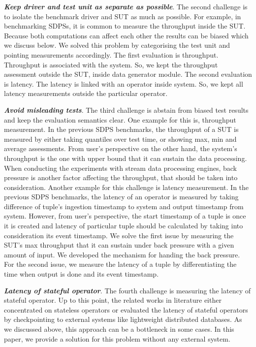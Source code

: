 \documentclass{vldb}
\begin{document}
\textbf{ \textit{Keep driver and test unit as separate as possible}}. The second challenge is to isolate the benchmark driver and SUT as much as possible. For example, in benchmarking SDPSs, it is common to measure the throughput inside the SUT. Because both computations can affect each other the results can be  biased  which we discuss below. We solved this problem by categorising the test unit and pointing measurements accordingly. The first evaluation is throughput. Throughput is associated with the system. So, we kept the throughput assessment outside the SUT, inside data generator module. The second evaluation is latency. The latency is linked with an operator inside system. So, we kept all latency measurements outside the particular operator.

\textbf{ \textit{ Avoid misleading tests}}.
The third challenge is abstain from biased test results and keep the evaluation semantics clear.  One example for this is, throughput measurement. In the previous SDPS benchmarks, the throughput of a SUT is measured by either taking quantiles over test time, or showing max, min and average assessments. From user's perspective on the other hand, the system's throughput is the one with upper bound that it can sustain the data processing. When conducting the experiments with stream data processing engines, back pressure is another factor affecting the throughput, that should be taken into consideration.  Another example for this challenge is latency measurement. In the previous SDPS benchmarks, the latency of an operator is measured by taking difference of tuple's ingestion timestamp to system and output timestamp from system. However, from user's perspective, the start timestamp of a tuple is once it is created and latency of particular tuple should be calculated by taking into consideration its event timestamp. We solve the first issue by measuring the SUT's max throughput that it can sustain under back pressure with a given amount of input. We developed the mechanism for handing the back pressure.  For the second issue, we measure the latency of a tuple by differentiating the time when output is done and its event timestamp.


\textbf{ \textit{ Latency of stateful operator}}. The fourth challenge is measuring the latency of stateful operator. Up to this point, the related works in literature either concentrated on stateless operators or evaluated the latency of stateful operators by checkpointing to external systems like lightweight distributed databases. As we discussed above, this approach can be a bottleneck in some cases. In this paper, we provide a solution for this problem without any external system. 
\end{document}
